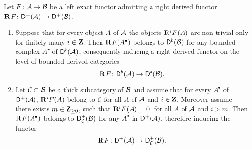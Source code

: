 \begin{proposition}
    \label{Spectral sequences for derived cats}
    Let $F \colon \mathcal A \to \mathcal B$ be a left exact functor admitting a right derived functor $\mathbf{R}^{}F\colon \mathsf{D}^+(\mathcal A) \to \mathsf{D}^+(\mathcal B)$. 
    \begin{enumerate}[label = (\roman*)]
        \item{Suppose that for every object $A$ of $\mathcal A$ the objects $\mathbf{R}^{i}F(A)$ are non-trivial only for finitely many $i \in \mathbf Z$. Then $\mathbf{R}^{}F(A^\bullet)$ belongs to $\mathsf{D}^b(\mathcal B)$ for any bounded complex $A^\bullet$ of $\mathsf{D}^b(\mathcal A)$, consequently inducing a right derived functor on the level of bounded derived categories
        \[
            \mathbf{R}^{}F \colon \mathsf{D}^b(\mathcal A) \to \mathsf{D}^b(\mathcal B).
        \]} \label{Bounded on objects implies bounded on complexes}
        \item{Let $\mathcal C \subset \mathcal B$ be a thick subcategory of $\mathcal B$ and assume that for every $A^\bullet$ of $\mathsf{D}^+(\mathcal A)$, $\mathbf{R}^{i}F(A)$ belong to $\mathcal C$ for all $A$ of $\mathcal A$ and $i \in \mathbf Z$. Moreover assume there exists $m \in \mathbf Z_{\geq 0}$, such that $\mathbf{R}^{i}F(A) = 0$, for all $A$ of $\mathcal A$ and $i > m$. Then $\mathbf{R}^{}F(A^\bullet)$ belongs to $\mathsf{D}^+_\mathcal{C}(\mathcal B)$ for any $A^\bullet$ in $\mathsf{D}^+(\mathcal A)$, therefore inducing the functor
        \[
            \mathbf{R}^{}F\colon \mathsf{D}^+(\mathcal A) \to \mathsf{D}^+_\mathcal{C}(\mathcal B).
        \]
        } \label{Cohomology in a thick subcategory}
    \end{enumerate}
\end{proposition}

